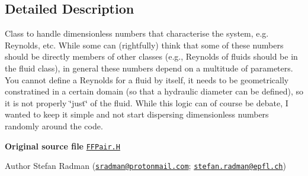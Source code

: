 \subsection{Detailed Description}
Class to handle dimensionless numbers that characterise the system, e.\+g. Reynolds, etc. While some can (rightfully) think that some of these numbers should be directly members of other classes (e.\+g., Reynolds of fluids should be in the fluid class), in general these numbers depend on a multitude of parameters. You cannot define a Reynolds for a fluid by itself, it needs to be geometrically constratined in a certain domain (so that a hydraulic diameter can be defined), so it is not properly \char`\"{}just\char`\"{} of the fluid. While this logic can of course be debate, I wanted to keep it simple and not start dispersing dimensionless numbers randomly around the code. 

{\bfseries Original source file} \href{../../../home/carlo/data/GeN-Foam/GeN-Foam_ffn/GeN-Foam/GeN-Foam/classes/thermalHydraulics/src/physicsModels/phasePairs/FFPair.H}{\tt F\+F\+Pair.\+H}

\label{_Description}%
 Author Stefan Radman (\href{mailto:sradman@protonmail.com}{\tt sradman@protonmail.\+com}; \href{mailto:stefan.radman@epfl.ch}{\tt stefan.\+radman@epfl.\+ch}) 